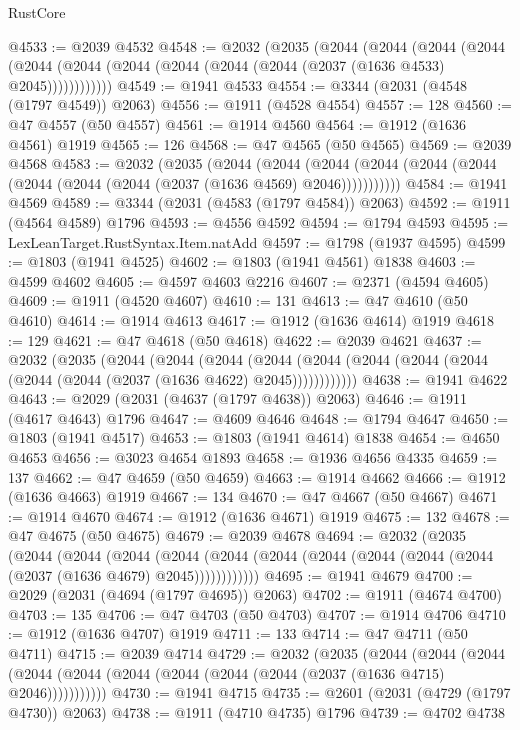 \begin{lexlean}{RustCore}
\begin{coremodule}
@4533 := @2039 @4532
@4548 := @2032
    (@2035
      (@2044
        (@2044
          (@2044
            (@2044 (@2044 (@2044 (@2044 (@2044 (@2044 (@2044 (@2037 (@1636 @4533) @2045))))))))))))
@4549 := @1941 @4533
@4554 := @3344 (@2031 (@4548 (@1797 @4549)) @2063)
@4556 := @1911 (@4528 @4554)
@4557 := 128
@4560 := @47 @4557 (@50 @4557)
@4561 := @1914 @4560
@4564 := @1912 (@1636 @4561) @1919
@4565 := 126
@4568 := @47 @4565 (@50 @4565)
@4569 := @2039 @4568
@4583 := @2032
    (@2035
      (@2044
        (@2044
          (@2044 (@2044 (@2044 (@2044 (@2044 (@2044 (@2044 (@2037 (@1636 @4569) @2046)))))))))))
@4584 := @1941 @4569
@4589 := @3344 (@2031 (@4583 (@1797 @4584)) @2063)
@4592 := @1911 (@4564 @4589) @1796
@4593 := @4556 @4592
@4594 := @1794 @4593
@4595 := LexLeanTarget.RustSyntax.Item.natAdd
@4597 := @1798 (@1937 @4595)
@4599 := @1803 (@1941 @4525)
@4602 := @1803 (@1941 @4561) @1838
@4603 := @4599 @4602
@4605 := @4597 @4603 @2216
@4607 := @2371 (@4594 @4605)
@4609 := @1911 (@4520 @4607)
@4610 := 131
@4613 := @47 @4610 (@50 @4610)
@4614 := @1914 @4613
@4617 := @1912 (@1636 @4614) @1919
@4618 := 129
@4621 := @47 @4618 (@50 @4618)
@4622 := @2039 @4621
@4637 := @2032
    (@2035
      (@2044
        (@2044
          (@2044
            (@2044 (@2044 (@2044 (@2044 (@2044 (@2044 (@2044 (@2037 (@1636 @4622) @2045))))))))))))
@4638 := @1941 @4622
@4643 := @2029 (@2031 (@4637 (@1797 @4638)) @2063)
@4646 := @1911 (@4617 @4643) @1796
@4647 := @4609 @4646
@4648 := @1794 @4647
@4650 := @1803 (@1941 @4517)
@4653 := @1803 (@1941 @4614) @1838
@4654 := @4650 @4653
@4656 := @3023 @4654 @1893
@4658 := @1936 @4656 @4335
@4659 := 137
@4662 := @47 @4659 (@50 @4659)
@4663 := @1914 @4662
@4666 := @1912 (@1636 @4663) @1919
@4667 := 134
@4670 := @47 @4667 (@50 @4667)
@4671 := @1914 @4670
@4674 := @1912 (@1636 @4671) @1919
@4675 := 132
@4678 := @47 @4675 (@50 @4675)
@4679 := @2039 @4678
@4694 := @2032
    (@2035
      (@2044
        (@2044
          (@2044
            (@2044 (@2044 (@2044 (@2044 (@2044 (@2044 (@2044 (@2037 (@1636 @4679) @2045))))))))))))
@4695 := @1941 @4679
@4700 := @2029 (@2031 (@4694 (@1797 @4695)) @2063)
@4702 := @1911 (@4674 @4700)
@4703 := 135
@4706 := @47 @4703 (@50 @4703)
@4707 := @1914 @4706
@4710 := @1912 (@1636 @4707) @1919
@4711 := 133
@4714 := @47 @4711 (@50 @4711)
@4715 := @2039 @4714
@4729 := @2032
    (@2035
      (@2044
        (@2044
          (@2044 (@2044 (@2044 (@2044 (@2044 (@2044 (@2044 (@2037 (@1636 @4715) @2046)))))))))))
@4730 := @1941 @4715
@4735 := @2601 (@2031 (@4729 (@1797 @4730)) @2063)
@4738 := @1911 (@4710 @4735) @1796
@4739 := @4702 @4738

\end{coremodule}
\end{lexlean}
